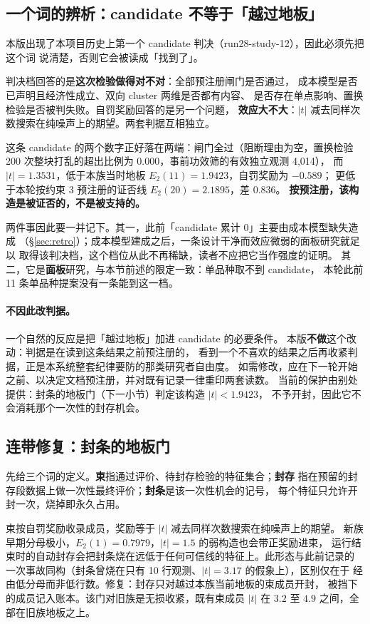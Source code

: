 \documentclass[11pt]{ctexart}
\begin{document}
\subsection{一个词的辨析：candidate 不等于「越过地板」}\label{sec:candmeaning}
本版出现了本项目历史上第一个 candidate 判决（run28-study-12），因此必须先把这个词
说清楚，否则它会被读成「找到了」。

判决档回答的是\textbf{这次检验做得对不对}：全部预注册闸门是否通过，
成本模型是否已声明且经济性成立、双向 cluster 两维是否都有内容、
是否存在单点影响、置换检验是否被判失败。自罚奖励回答的是另一个问题，
\textbf{效应大不大}：$|t|$ 减去同样次数搜索在纯噪声上的期望。两套判据互相独立。

这条 candidate 的两个数字正好落在两端：闸门全过（阻断理由为空，置换检验
200 次整块打乱的超出比例为 0.000，事前功效筛的有效独立观测 4{,}014），
而 $|t|=1.3531$，低于本族当时地板 $E_2(11)=1.9423$，自罚奖励为 $-0.589$；
更低于本轮按约束 3 预注册的证否线 $E_2(20)=2.1895$，差 0.836。
\textbf{按预注册，该构造是被证否的，不是被支持的。}

两件事因此要一并记下。其一，此前「candidate 累计 0」主要由成本模型缺失造成
（\S\ref{sec:retro}）；成本模型建成之后，一条设计干净而效应微弱的面板研究就足以
取得该判决档，这个档位从此不再稀缺，读者不应把它当作强度的证明。
其二，它是\textbf{面板}研究，与本节前述的限定一致：单品种取不到 candidate，
本轮此前 11 条单品种提案没有一条能到这一档。

\paragraph{不因此改判据。}一个自然的反应是把「越过地板」加进 candidate 的必要条件。
本版\textbf{不做}这个改动：判据是在读到这条结果之前预注册的，
看到一个不喜欢的结果之后再收紧判据，正是本系统整套纪律要防的那类研究者自由度。
如需修改，应在下一轮开始之前、以决定文档预注册，并对既有记录一律重印两套读数。
当前的保护由别处提供：封条的地板门（下一小节）判定该构造 $|t|<1.9423$，
不予开封，因此它不会消耗那个一次性的封存机会。

\subsection{连带修复：封条的地板门}
先给三个词的定义。\textbf{束}指通过评价、待封存检验的特征集合；\textbf{封存}
指在预留的封存段数据上做一次性最终评价；\textbf{封条}是该一次性机会的记号，
每个特征只允许开封一次，烧掉即永久占用。

束按自罚奖励收录成员，奖励等于 $|t|$ 减去同样次数搜索在纯噪声上的期望。
新族早期分母极小，$E_2(1)=0.7979$，$|t|=1.5$ 的弱构造也会带正奖励进束，
运行结束时的自动封存会把封条烧在远低于任何可信线的特征上。此形态与此前记录的
一次事故同构（封条曾烧在只有 10 行观测、$|t|=3.17$ 的假象上），区别仅在于
经由低分母而非低行数。修复：封存只对越过本族当前地板的束成员开封，
被挡下的成员记入账本。该门对旧族是无损收紧，既有束成员 $|t|$ 在 $3.2$ 至 $4.9$
之间，全部在旧族地板之上。
\end{document}
